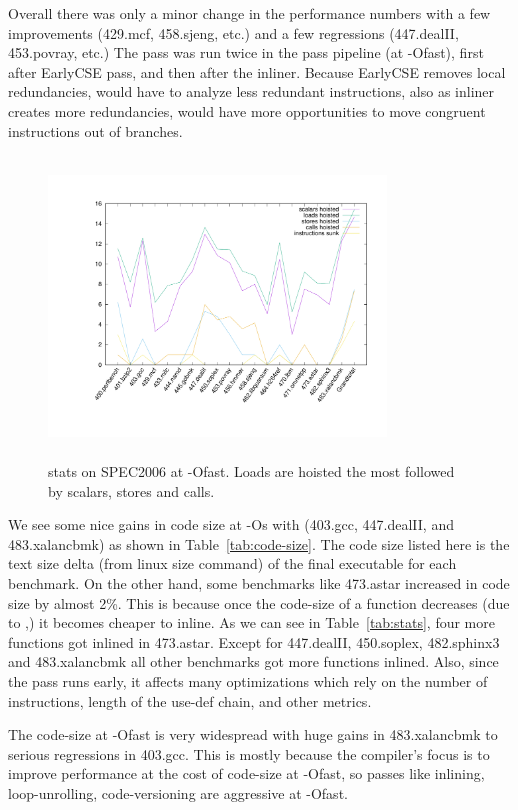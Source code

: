 \documentclass[sigplan,10pt,review,anonymous]{acmart}\settopmatter{printfolios=true,printccs=false,printacmref=false}
\begin{document}
Overall there was only a minor change in the performance numbers with a few improvements 
(429.mcf, 458.sjeng, etc.) and a few regressions (447.dealII, 453.povray,
etc.) The \gcm{} pass was run twice in the pass pipeline (at -Ofast),
first after EarlyCSE pass, and then after the inliner. Because EarlyCSE removes
local redundancies, \GCM{} would have to analyze less redundant instructions, also
as inliner creates more redundancies, \GCM{} would have more opportunities to move
congruent instructions out of branches.

\begin{figure}[h!]
  \includegraphics[width=0.8\textwidth,height=8cm]{gcm-stats.pdf}
  \vspace*{-1.5cm}
\caption{\GCM{} stats on SPEC2006 at -Ofast. Loads are hoisted the most followed
  by scalars, stores and calls.}
\label{tab:code-motion-metric}
\end{figure}

We see some nice gains in code size at -Os with \gcm{} (403.gcc, 447.dealII, and
483.xalancbmk) as shown in Table~\ref{tab:code-size}.  The code size listed here
is the text size delta (from linux size command) of the final executable for
each benchmark.  On the other hand, some benchmarks like 473.astar increased in
code size by almost 2\%. This is because once the code-size of a function
decreases (due to \GCM{},) it becomes cheaper to inline. As we can see in
Table~\ref{tab:stats}, four more functions got inlined in 473.astar. Except for
447.dealII, 450.soplex, 482.sphinx3 and 483.xalancbmk all other benchmarks got
more functions inlined. Also, since the pass runs early, it affects many
optimizations which rely on the number of instructions, length of the use-def
chain, and other metrics.

The code-size at -Ofast is very widespread with huge gains in 483.xalancbmk to
serious regressions in 403.gcc. This is mostly because the compiler's focus is
to improve performance at the cost of code-size at -Ofast, so passes like
inlining, loop-unrolling, code-versioning are aggressive at -Ofast.
\end{document}

